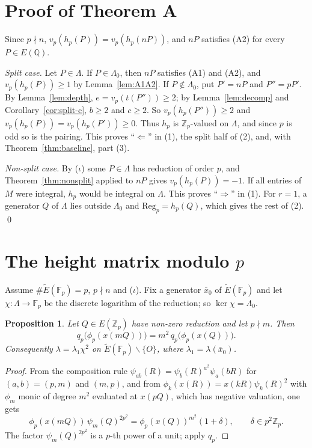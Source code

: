 \documentclass[11pt,a4paper]{amsart}
\newcommand{\Q}{\mathbb{Q}}
\newcommand{\Zp}{\mathbb{Z}_p}
\newcommand{\Fp}{\mathbb{F}_p}
\newcommand{\Reg}{\mathrm{Reg}}
\newcommand{\Et}{\widetilde{E}}
\newcommand{\Lam}{\Lambda}
\newcommand{\qp}{q_p}
\theoremstyle{plain}
\newtheorem{proposition}[theorem]{Proposition}
\theoremstyle{definition}
\theoremstyle{remark}
\begin{document}
\section{Proof of Theorem A}\label{sec:main}

Since $p\nmid n$, $v_p(h_p(P))=v_p(h_p(nP))$, and $nP$ satisfies \textup{(A2)} for every $P\in E(\Q)$.

\emph{Split case.} Let $P\in\Lam$. If $P\in\Lam_0$, then $nP$ satisfies \textup{(A1)} and \textup{(A2)}, and $v_p(h_p(P))\ge1$ by Lemma~\ref{lem:A1A2}. If $P\notin\Lam_0$, put $P'=nP$ and $P''=pP'$. By Lemma~\ref{lem:depth}, $e=v_p(t(P''))\ge2$; by Lemma~\ref{lem:decomp} and Corollary~\ref{cor:split-c}, $b\ge2$ and $c\ge2$. So $v_p(h_p(P''))\ge2$ and $v_p(h_p(P))=v_p(h_p(P'))\ge0$. Thus $h_p$ is $\Zp$-valued on $\Lam$, and since $p$ is odd so is the pairing. This proves ``$\Leftarrow$'' in (1), the split half of (2), and, with Theorem~\ref{thm:baseline}, part (3).

\emph{Non-split case.} By \textup{($\iota$)} some $P\in\Lam$ has reduction of order $p$, and Theorem~\ref{thm:nonsplit} applied to $nP$ gives $v_p(h_p(P))=-1$. If all entries of $M$ were integral, $h_p$ would be integral on $\Lam$. This proves ``$\Rightarrow$'' in (1). For $r=1$, a generator $Q$ of $\Lam$ lies outside $\Lam_0$ and $\Reg_p=h_p(Q)$, which gives the rest of (2). \qed

\section{The height matrix modulo \texorpdfstring{$p$}{p}}\label{sec:modp}

Assume $\#\Et(\Fp)=p$, $p\nmid n$ and \textup{($\iota$)}. Fix a generator $\bar x_0$ of $\Et(\Fp)$ and let $\chi\colon\Lam\to\Fp$ be the discrete logarithm of the reduction; so $\ker\chi=\Lam_0$.

\begin{proposition}\label{prop:scaling}
Let $Q\in E(\Zp)$ have non-zero reduction and let $p\nmid m$. Then \[\qp\bigl(\phi_p(x(mQ))\bigr)=m^2\,\qp\bigl(\phi_p(x(Q))\bigr).\] Consequently $\lambda=\lambda_1\chi^2$ on $\Et(\Fp)\smallsetminus\{O\}$, where $\lambda_1=\lambda(\bar x_0)$.
\end{proposition}

\begin{proof}
From the composition rule $\psi_{ab}(R)=\psi_b(R)^{a^2}\psi_a(bR)$ for $(a,b)=(p,m)$ and $(m,p)$, and from $\phi_k(x(R))=x(kR)\psi_k(R)^2$ with $\phi_m$ monic of degree $m^2$ evaluated at $x(pQ)$, which has negative valuation, one gets
\[
\phi_p(x(mQ))\,\psi_m(Q)^{2p^2}=\phi_p(x(Q))^{m^2}(1+\delta),\qquad\delta\in p^2\Zp .
\]
The factor $\psi_m(Q)^{2p^2}$ is a $p$-th power of a unit; apply $\qp$.
\end{proof}
\end{document}
